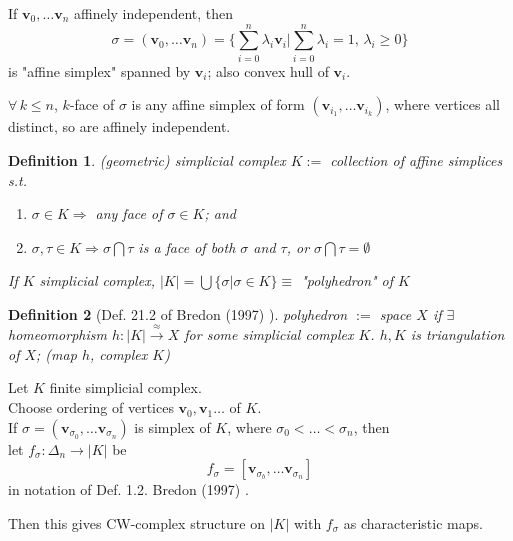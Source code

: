\documentclass[10pt]{amsart}
\newtheorem{definition}{Definition}
\begin{document}
\begin{multicols*}{2}
If $\mathbf{v}_0, \dots \mathbf{v}_n$ affinely independent, then 
\begin{equation}
\sigma = ( \mathbf{v}_0, \dots \mathbf{v}_n) = \lbrace \sum_{i=0}^n \lambda_i \mathbf{v}_i | \sum_{i=0}^n \lambda_i = 1, \, \lambda_i \geq 0 \rbrace
\end{equation}
is "affine simplex" spanned by $\mathbf{v}_i$; also convex hull of $\mathbf{v}_i$.  

$\forall \, k \leq n$, $k$-face of $\sigma$ is any affine simplex of form $(\mathbf{v}_{i_1}, \dots \mathbf{v}_{i_k})$, where vertices all distinct, so are affinely independent.  

\begin{definition}
	(geometric) simplicial complex $K:= $ collection of affine simplices s.t. \begin{enumerate}
		\item $\sigma \in K \Longrightarrow $ any face of $\sigma \in K$; and 
		\item $\sigma, \tau \in K \Longrightarrow \sigma \bigcap \tau $ is a face of both $\sigma$ and $\tau$, or $\sigma \bigcap \tau =\emptyset$
	\end{enumerate}

If $K$ simplicial complex, $|K| = \bigcup \lbrace \sigma | \sigma \in K \rbrace \equiv $ "polyhedron" of $K$
\end{definition}

\begin{definition}[Def. 21.2 of Bredon (1997) \cite{Bred1997}]
	polyhedron $:= $ space $X$ if $\exists \, $ homeomorphism $h: |K| \xrightarrow{ \approx } X$ for some simplicial complex $K$.  
	$h,K$ is triangulation of $X$; (map $h$, complex $K$)
\end{definition}

Let $K$ finite simplicial complex.  \\
Choose ordering of vertices $\mathbf{v}_0,\mathbf{v}_1\dots $ of $K$.  \\
If $\sigma = (\mathbf{v}_{\sigma_0}, \dots \mathbf{v}_{\sigma_n})$ is simplex of $K$, where $\sigma_0 < \dots < \sigma_n$, then  \\
\phantom{If } let $f_{\sigma} : \Delta_n \to |K|$ be 
\[
f_{\sigma} = [\mathbf{v}_{\sigma_b}, \dots \mathbf{v}_{\sigma_n}]
\]
in notation of Def. 1.2.  Bredon (1997) \cite{Bred1997}.  

Then this gives CW-complex structure on $|K|$ with $f_{\sigma}$ as characteristic maps.  





\end{multicols*}
\end{document}
